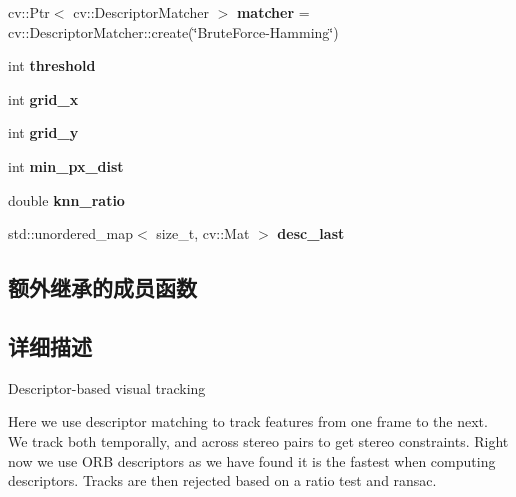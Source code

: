 \begin{DoxyCompactItemize}
\item 
\mbox{\label{classov__core_1_1TrackDescriptor_a0b7f0798d71dc4a3f803098e097f7eb9}} 
cv\+::\+Ptr$<$ cv\+::\+Descriptor\+Matcher $>$ {\bfseries matcher} = cv\+::\+Descriptor\+Matcher\+::create(\char`\"{}Brute\+Force-\/Hamming\char`\"{})
\item 
\mbox{\label{classov__core_1_1TrackDescriptor_a150ead1b37d1a8a2319d6c2d9b955d46}} 
int {\bfseries threshold}
\item 
\mbox{\label{classov__core_1_1TrackDescriptor_ad44a5a5edd9eb38b442b71c7c68630fa}} 
int {\bfseries grid\+\_\+x}
\item 
\mbox{\label{classov__core_1_1TrackDescriptor_a842119cdd662e4bcbab084187706e991}} 
int {\bfseries grid\+\_\+y}
\item 
\mbox{\label{classov__core_1_1TrackDescriptor_a8d410818845fb5d57615f8e87862b8dc}} 
int {\bfseries min\+\_\+px\+\_\+dist}
\item 
\mbox{\label{classov__core_1_1TrackDescriptor_a80c29687d05a0f34e5ed7f09702fc8f1}} 
double {\bfseries knn\+\_\+ratio}
\item 
\mbox{\label{classov__core_1_1TrackDescriptor_a887713e7440883d8d7e3c58efd0fa155}} 
std\+::unordered\+\_\+map$<$ size\+\_\+t, cv\+::\+Mat $>$ {\bfseries desc\+\_\+last}
\end{DoxyCompactItemize}
\subsection*{额外继承的成员函数}


\subsection{详细描述}
Descriptor-\/based visual tracking 

Here we use descriptor matching to track features from one frame to the next. We track both temporally, and across stereo pairs to get stereo constraints. Right now we use O\+RB descriptors as we have found it is the fastest when computing descriptors. Tracks are then rejected based on a ratio test and ransac. 

